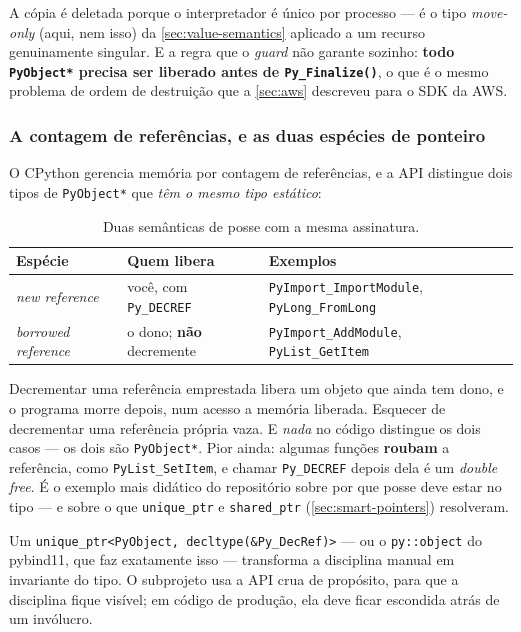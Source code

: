 A cópia é deletada porque o interpretador é único por processo --- é o tipo
\emph{move-only} (aqui, nem isso) da \cref{sec:value-semantics} aplicado a um
recurso genuinamente singular. E a regra que o \emph{guard} não garante sozinho:
\textbf{todo \texttt{PyObject*} precisa ser liberado antes de
\texttt{Py\_Finalize()}}, o que é o mesmo problema de ordem de destruição que a
\cref{sec:aws} descreveu para o SDK da AWS.

\subsubsection{A contagem de referências, e as duas espécies de ponteiro}

O CPython gerencia memória por contagem de referências, e a API distingue dois
tipos de \texttt{PyObject*} que \emph{têm o mesmo tipo estático}:

\begin{table}[htbp]
\centering
\caption{Duas semânticas de posse com a mesma assinatura.}
\label{tab:pyref}
\footnotesize
\begin{tabular}{@{}lll@{}}
\toprule
\textbf{Espécie} & \textbf{Quem libera} & \textbf{Exemplos} \\
\midrule
\emph{new reference}      & você, com \texttt{Py\_DECREF} & \texttt{PyImport\_ImportModule}, \texttt{PyLong\_FromLong} \\
\emph{borrowed reference} & o dono; \textbf{não} decremente & \texttt{PyImport\_AddModule}, \texttt{PyList\_GetItem} \\
\bottomrule
\end{tabular}
\end{table}

\begin{armadilha}
Decrementar uma referência emprestada libera um objeto que ainda tem dono, e o
programa morre depois, num acesso a memória liberada. Esquecer de decrementar
uma referência própria vaza. E \emph{nada} no código distingue os dois casos ---
os dois são \texttt{PyObject*}. Pior ainda: algumas funções \textbf{roubam} a
referência, como \texttt{PyList\_SetItem}, e chamar \texttt{Py\_DECREF} depois
dela é um \emph{double free}. É o exemplo mais didático do repositório sobre por
que posse deve estar no tipo --- e sobre o que \texttt{unique\_ptr} e
\texttt{shared\_ptr} (\cref{sec:smart-pointers}) resolveram.
\end{armadilha}

\begin{regra}
Um \texttt{unique\_ptr<PyObject, decltype(\&Py\_DecRef)>} --- ou o
\texttt{py::object} do pybind11, que faz exatamente isso --- transforma a
disciplina manual em invariante do tipo. O subprojeto usa a API crua de
propósito, para que a disciplina fique visível; em código de produção, ela deve
ficar escondida atrás de um invólucro.
\end{regra}

